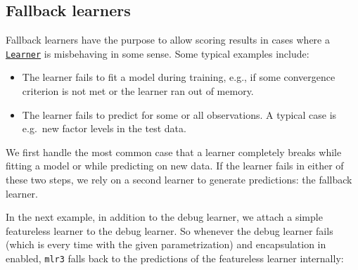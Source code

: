 \documentclass[
]{scrbook}
\newenvironment{Shaded}{\begin{snugshade}}{\end{snugshade}}
\newcommand{\AttributeTok}[1]{\textcolor[rgb]{0.77,0.63,0.00}{#1}}
\newcommand{\DecValTok}[1]{\textcolor[rgb]{0.00,0.00,0.81}{#1}}
\newcommand{\FunctionTok}[1]{\textcolor[rgb]{0.00,0.00,0.00}{#1}}
\newcommand{\NormalTok}[1]{#1}
\newcommand{\OtherTok}[1]{\textcolor[rgb]{0.56,0.35,0.01}{#1}}
\newcommand{\SpecialCharTok}[1]{\textcolor[rgb]{0.00,0.00,0.00}{#1}}
\newcommand{\StringTok}[1]{\textcolor[rgb]{0.31,0.60,0.02}{#1}}
\providecommand{\tightlist}{%
  \setlength{\itemsep}{0pt}\setlength{\parskip}{0pt}}
\renewenvironment{Shaded} {\begin{snugshade}\small} {\end{snugshade}}
\begin{document}
\hypertarget{fallback-learners}{%
\subsection{Fallback learners}\label{fallback-learners}}

Fallback learners have the purpose to allow scoring results in cases where a \href{https://mlr3.mlr-org.com/reference/Learner.html}{\texttt{Learner}} is misbehaving in some sense.
Some typical examples include:

\begin{itemize}
\tightlist
\item
  The learner fails to fit a model during training, e.g., if some convergence criterion is not met or the learner ran out of memory.
\item
  The learner fails to predict for some or all observations.
  A typical case is e.g.~new factor levels in the test data.
\end{itemize}

We first handle the most common case that a learner completely breaks while fitting a model or while predicting on new data.
If the learner fails in either of these two steps, we rely on a second learner to generate predictions: the fallback learner.

In the next example, in addition to the debug learner, we attach a simple featureless learner to the debug learner.
So whenever the debug learner fails (which is every time with the given parametrization) and encapsulation in enabled, \texttt{mlr3} falls back to the predictions of the featureless learner internally:

\begin{Shaded}
\end{Shaded}
\end{document}
